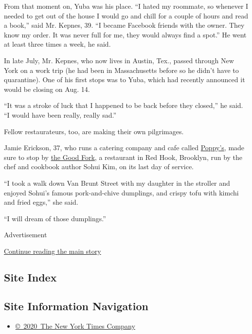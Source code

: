 From that moment on, Yuba was his place. ``I hated my roommate, so
whenever I needed to get out of the house I would go and chill for a
couple of hours and read a book,'' said Mr. Kepnes, 39. ``I became
Facebook friends with the owner. They know my order. It was never full
for me, they would always find a spot.'' He went at least three times a
week, he said.

In late July, Mr. Kepnes, who now lives in Austin, Tex., passed through
New York on a work trip (he had been in Massachusetts before so he
didn't have to quarantine). One of his first stops was to Yuba, which
had recently announced it would be closing on Aug. 14.

``It was a stroke of luck that I happened to be back before they
closed,'' he said. ``I would have been really, really sad.''

Fellow restaurateurs, too, are making their own pilgrimages.

Jamie Erickson, 37, who runs a catering company and cafe called
\href{https://www.poppyscatering.com/}{Poppy's}, made sure to stop by
\href{https://www.goodfork.com/}{the Good Fork}, a restaurant in Red
Hook, Brooklyn, run by the chef and cookbook author Sohui Kim, on its
last day of service.

``I took a walk down Van Brunt Street with my daughter in the stroller
and enjoyed Sohui's famous pork-and-chive dumplings, and crispy tofu
with kimchi and fried eggs,'' she said.

``I will dream of those dumplings.''

Advertisement

\protect\hyperlink{after-bottom}{Continue reading the main story}

\hypertarget{site-index}{%
\subsection{Site Index}\label{site-index}}

\hypertarget{site-information-navigation}{%
\subsection{Site Information
Navigation}\label{site-information-navigation}}

\begin{itemize}
\tightlist
\item
  \href{https://help.nytimes3xbfgragh.onion/hc/en-us/articles/115014792127-Copyright-notice}{©~2020~The
  New York Times Company}
\end{itemize}

